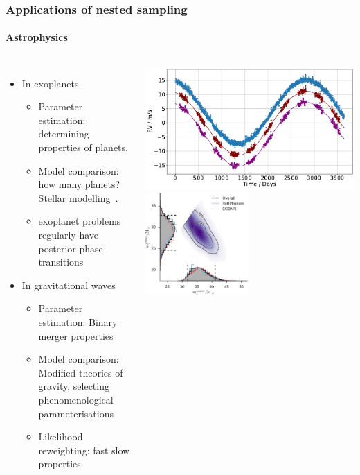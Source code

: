 \documentclass[aspectratio=169]{beamer}
\begin{document}
    \begin{frame}
        \frametitle{Applications of nested sampling}
        \framesubtitle{Astrophysics}
        \begin{columns}
            \begin{itemize}
                \item In exoplanets~
                    \begin{itemize}
                        \item Parameter estimation: determining properties of planets.
                        \item Model comparison: how many planets? Stellar modelling~.
                        \item exoplanet problems regularly have posterior phase transitions 
                    \end{itemize}
                \item In gravitational waves
                    \begin{itemize}
                        \item Parameter estimation: Binary merger properties
                        \item Model comparison: Modified theories of gravity, selecting phenomenological parameterisations~
                        \item Likelihood reweighting: fast slow properties
                    \end{itemize}
            \end{itemize}
            \includegraphics[width=\textwidth]{figures/rv_full.pdf}
            \includegraphics[width=0.49\textwidth]{figures/ligo_m1_m2.pdf}

\end{columns}
\end{frame}
\end{document}
